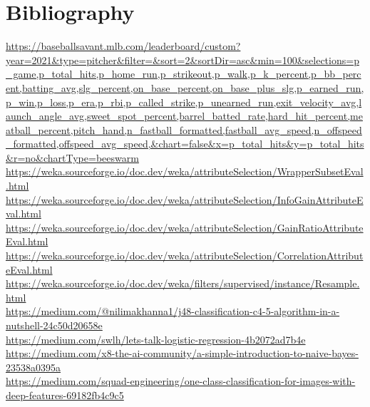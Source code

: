 \documentclass[12pt]{article}
\begin{document}
\newpage
\section{Bibliography}
\url{https://baseballsavant.mlb.com/leaderboard/custom?year=2021&type=pitcher&filter=&sort=2&sortDir=asc&min=100&selections=p_game,p_total_hits,p_home_run,p_strikeout,p_walk,p_k_percent,p_bb_percent,batting_avg,slg_percent,on_base_percent,on_base_plus_slg,p_earned_run,p_win,p_loss,p_era,p_rbi,p_called_strike,p_unearned_run,exit_velocity_avg,launch_angle_avg,sweet_spot_percent,barrel_batted_rate,hard_hit_percent,meatball_percent,pitch_hand,n_fastball_formatted,fastball_avg_speed,n_offspeed_formatted,offspeed_avg_speed,&chart=false&x=p_total_hits&y=p_total_hits&r=no&chartType=beeswarm} \\
\url{https://weka.sourceforge.io/doc.dev/weka/attributeSelection/WrapperSubsetEval.html} \\
\url{https://weka.sourceforge.io/doc.dev/weka/attributeSelection/InfoGainAttributeEval.html} \\
\url{https://weka.sourceforge.io/doc.dev/weka/attributeSelection/GainRatioAttributeEval.html} \\
\url{https://weka.sourceforge.io/doc.dev/weka/attributeSelection/CorrelationAttributeEval.html} \\
\url{https://weka.sourceforge.io/doc.dev/weka/filters/supervised/instance/Resample.html} \\
\url{https://medium.com/@nilimakhanna1/j48-classification-c4-5-algorithm-in-a-nutshell-24c50d20658e} \\
\url{https://medium.com/swlh/lets-talk-logistic-regression-4b2072ad7b4e} \\
\url{https://medium.com/x8-the-ai-community/a-simple-introduction-to-naive-bayes-23538a0395a} \\
\url{https://medium.com/squad-engineering/one-class-classification-for-images-with-deep-features-69182fb4c9c5}
\end{document}

